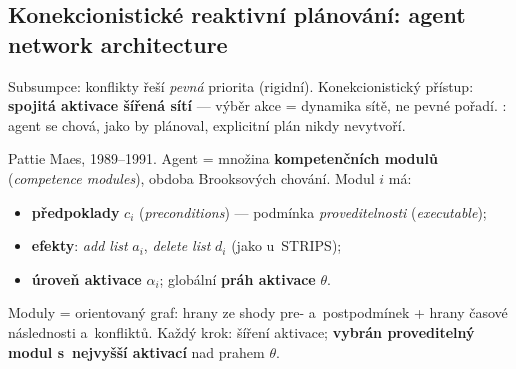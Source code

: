 \documentclass[11pt,a4paper]{article}
\theoremstyle{definition}
\begin{document}
\subsection{Konekcionistické reaktivní plánování: agent network architecture}
\label{ssec:maes}

Subsumpce: konflikty řeší \emph{pevná} priorita (rigidní). Konekcionistický přístup:
\textbf{spojitá aktivace šířená sítí} --- výběr akce = dynamika sítě, ne pevné pořadí.
: agent se chová, jako by plánoval, explicitní plán nikdy nevytvoří.

\begin{defbox}
Pattie Maes, 1989--1991. Agent = množina \textbf{kompetenčních modulů} (\emph{competence
modules}), obdoba Brooksových chování. Modul $i$ má:
\begin{itemize}
\item \textbf{předpoklady} $c_i$ (\emph{preconditions}) --- podmínka \emph{proveditelnosti}
  (\emph{executable});
\item \textbf{efekty}: \emph{add list} $a_i$, \emph{delete list} $d_i$ (jako u~STRIPS);
\item \textbf{úroveň aktivace} $\alpha_i$; globální \textbf{práh aktivace} $\theta$.
\end{itemize}
Moduly = orientovaný graf: hrany ze shody pre- a~postpodmínek + hrany časové následnosti
a~konfliktů. Každý krok: šíření aktivace; \textbf{vybrán proveditelný modul s~nejvyšší
aktivací} nad prahem $\theta$.
\end{defbox}
\end{document}
